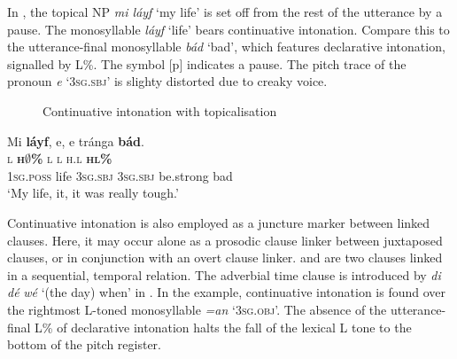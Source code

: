 In , the topical \textsc{NP} \textit{mi láyf} ‘my life’ is set off from the rest of the utterance by a pause. The monosyllable \textit{láyf} ‘life’ bears continuative intonation. Compare this to the utterance-final monosyllable \textit{bád} ‘bad’, which features declarative intonation, signalled by L\%. The symbol [p] indicates a pause. The pitch trace of the pronoun \textit{e} ‘\textsc{3sg.sbj}’ is slighty distorted due to creaky voice.


\begin{figure}
\caption{Continuative intonation with topicalisation}
\label{fig:key:3.39}
\end{figure}

\ea\label{ex:key:92}
\glll Mi \textbf{láyf},  e,    e    tránga \textbf{bád}.\\
\textsc{l}    \textbf{\textsc{h${\emptyset}$}}\textbf{\textsc{\%}  }  \textsc{l}    \textsc{l}    \textsc{h.l}      \textbf{\textsc{hl\%}}\\
\textsc{1sg.poss}  life    \textsc{3sg.sbj}  \textsc{3sg.sbj}  be.strong  bad\\
\glt ‘My life, it, it was really tough.’    
\z

Continuative intonation is also employed as a juncture marker between linked clauses. Here, it may occur alone as a prosodic clause linker between juxtaposed clauses, or in conjunction with an overt clause linker.  and  are two clauses linked in a sequential, temporal relation. The adverbial time clause is introduced by \textit{di} \textit{dé} \textit{wé} ‘(the day) when’ in . In the example, continuative intonation is found over the rightmost L-toned monosyllable \textit{=an} ‘\textsc{3sg.obj}’. The absence of the utterance-final L\% of declarative intonation halts the fall of the lexical L tone to the bottom of the pitch register.

